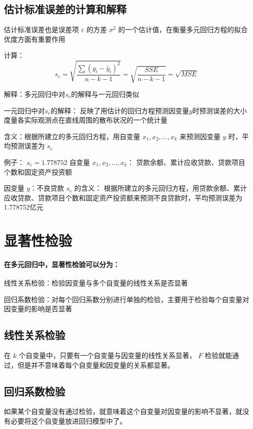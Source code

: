 \documentclass[UTF8,10pt]{book}
\begin{document}
\subsection{估计标准误差的计算和解释}	

估计标准误差也是误差项 $\varepsilon$ 的方差 $ \sigma^2 $ 的一个估计值，在衡量多元回归方程的拟合优度方面有重要作用 

计算： 
$$ s_{e}=\sqrt{\frac{\sum\left(y_{i}-\hat{y}_{i}\right)^{2}}{n-k-1}}=\sqrt{\frac{S S E}{n-k-1}}=\sqrt{M S E} $$ 

解释：多元回归中对$s_e$的解释与一元回归类似 

一元回归中对$s_e$的解释： 反映了用估计的回归方程预测因变量$y$时预测误差的大小度量各实际观测点在直线周围的散布状况的一个统计量 

含义：根据所建立的多元回归方程，用自变量 $x_1,x_2,...,x_k$ 来预测因变量 $y$ 时，平均预测误差为 $s_e$ 

例子： $s_e = 1.778752$ 自变量 $x_1,x_2,...,x_k$：
贷款余额、累计应收贷款、贷款项目个数和固定资产投资额 

因变量 $y$：不良贷款 $s_e$ 的含义： 根据所建立的多元回归方程，用贷款余额、累计应收贷款、贷款项目个数和固定资产投资额来预测不良贷款时，平均预测误差为1.778752亿元

\section{显著性检验}
\paragraph{在多元回归中，显著性检验可以分为：}	

线性关系检验：检验因变量与多个自变量的线性关系是否显著

回归系数检验：对每个回归系数分别进行单独的检验，主要用于检验每个自变量对因变量的影响是否显著

\subsection{线性关系检验}	在 $k$ 个自变量中，只要有一个自变量与因变量的线性关系显著， $F$ 检验就能通过，但是并不意味着每个自变量和因变量的关系都显著。

\subsection{回归系数检验}	如果某个自变量没有通过检验，就意味着这个自变量对因变量的影响不显著，就没有必要将这个自变量放进回归模型中了。
\end{document}
